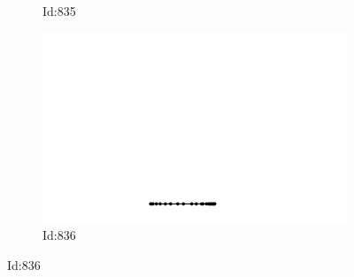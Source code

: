 \documentclass[12pt,twoside]{report}
\begin{document}
\begin{figure}
\begin{subfigure}[b]{0.20\textwidth}
\caption{Id:835}
\end{subfigure}
\begin{subfigure}[b]{0.20\textwidth}
\centering
\includegraphics[width=\textwidth]{../../trajectories/836.png}
\caption{Id:836}
\end{subfigure}
\end{figure}
\end{document}
